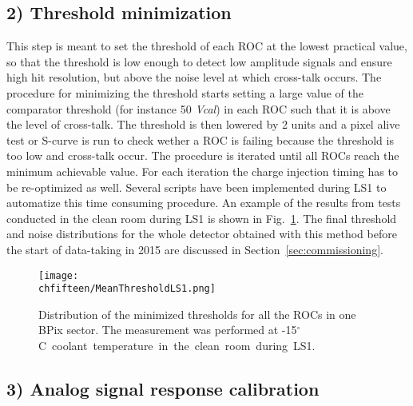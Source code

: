 \subsection*{2) Threshold minimization}

This step is meant to set the threshold of each ROC at the lowest practical value, so that the threshold is low enough to detect low amplitude signals and ensure high hit resolution,
but above the noise level at which cross-talk occurs.
The procedure for minimizing the threshold starts setting a large value of the comparator threshold (for instance 50 \textit{Vcal}) in each ROC such that it is above the level of cross-talk.
The threshold is then lowered by 2 units and a pixel alive test or S-curve is run to check wether a ROC is failing because the threshold is too low and cross-talk occur.
The procedure is iterated until all ROCs reach the minimum achievable value. For each iteration the charge injection timing has to be re-optimized as well.
Several scripts have been implemented during LS1 to automatize this time consuming procedure. An example of the results from tests conducted in the clean room during LS1 is shown in Fig.~\ref{fig:ThrCalibLS1}.
The final threshold and noise distributions for the whole detector obtained with this method before the start of data-taking in 2015 are discussed in Section~\ref{sec:commissioning}.

\begin{figure}[!htb]
\begin{center}
 \texttt{[image: \\chfifteen/MeanThresholdLS1.png]}
 \end{center}
 \caption{Distribution of the minimized thresholds for all the ROCs in one BPix sector. The measurement was performed at -15\unit{$^\circ$C} coolant temperature in the clean room during LS1.}
 \label{fig:ThrCalibLS1}
\end{figure}

\subsection*{3) Analog signal response calibration}

